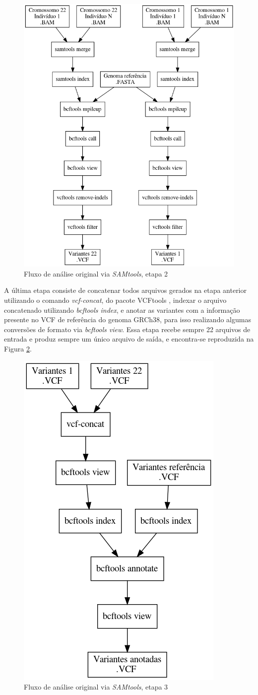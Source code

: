 \documentclass[cic,tc]{iiufrgs}
\begin{document}
\begin{figure}
  \caption{Fluxo de análise original via \textit{SAMtools}, etapa 2}
    \begin{center}
      \includegraphics[width=0.65\linewidth]{img/stage2_orig.png}
    \end{center}
    \label{fig:stage2_orig}
\end{figure}

A última etapa consiste de concatenar todos arquivos gerados na etapa anterior
utilizando o comando \textit{vcf-concat}, do pacote
VCFtools \cite{10.1093/bioinformatics/btr330}, indexar o arquivo concatenado
utilizando \textit{bcftools index}, e anotar as variantes com a informação
presente no VCF de referência do genoma GRCh38, para isso realizando algumas
conversões de formato via \textit{bcftools view}. Essa etapa recebe sempre 22
arquivos de entrada e produz sempre um único arquivo de saída, e encontra-se
reproduzida na Figura \ref{fig:stage3_orig}.

\begin{figure}
  \caption{Fluxo de análise original via \textit{SAMtools}, etapa 3}
    \begin{center}
      \includegraphics[width=0.30\linewidth]{img/stage3_orig.png}
    \end{center}
    \label{fig:stage3_orig}
\end{figure}
\end{document}
